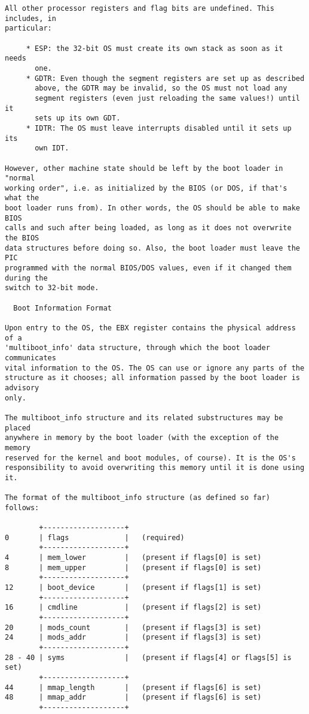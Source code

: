\begin{verbatim}
All other processor registers and flag bits are undefined. This includes, in
particular:

     * ESP: the 32-bit OS must create its own stack as soon as it needs
       one.
     * GDTR: Even though the segment registers are set up as described
       above, the GDTR may be invalid, so the OS must not load any
       segment registers (even just reloading the same values!) until it
       sets up its own GDT.
     * IDTR: The OS must leave interrupts disabled until it sets up its
       own IDT.
       
However, other machine state should be left by the boot loader in "normal
working order", i.e. as initialized by the BIOS (or DOS, if that's what the
boot loader runs from). In other words, the OS should be able to make BIOS
calls and such after being loaded, as long as it does not overwrite the BIOS
data structures before doing so. Also, the boot loader must leave the PIC
programmed with the normal BIOS/DOS values, even if it changed them during the
switch to 32-bit mode.

  Boot Information Format
  
Upon entry to the OS, the EBX register contains the physical address of a
'multiboot_info' data structure, through which the boot loader communicates
vital information to the OS. The OS can use or ignore any parts of the
structure as it chooses; all information passed by the boot loader is advisory
only.

The multiboot_info structure and its related substructures may be placed
anywhere in memory by the boot loader (with the exception of the memory
reserved for the kernel and boot modules, of course). It is the OS's
responsibility to avoid overwriting this memory until it is done using it.

The format of the multiboot_info structure (as defined so far) follows:

        +-------------------+
0       | flags             |   (required)
        +-------------------+
4       | mem_lower         |   (present if flags[0] is set)
8       | mem_upper         |   (present if flags[0] is set)
        +-------------------+
12      | boot_device       |   (present if flags[1] is set)
        +-------------------+
16      | cmdline           |   (present if flags[2] is set)
        +-------------------+
20      | mods_count        |   (present if flags[3] is set)
24      | mods_addr         |   (present if flags[3] is set)
        +-------------------+
28 - 40 | syms              |   (present if flags[4] or flags[5] is set)
        +-------------------+
44      | mmap_length       |   (present if flags[6] is set)
48      | mmap_addr         |   (present if flags[6] is set)
        +-------------------+


\end{verbatim}
